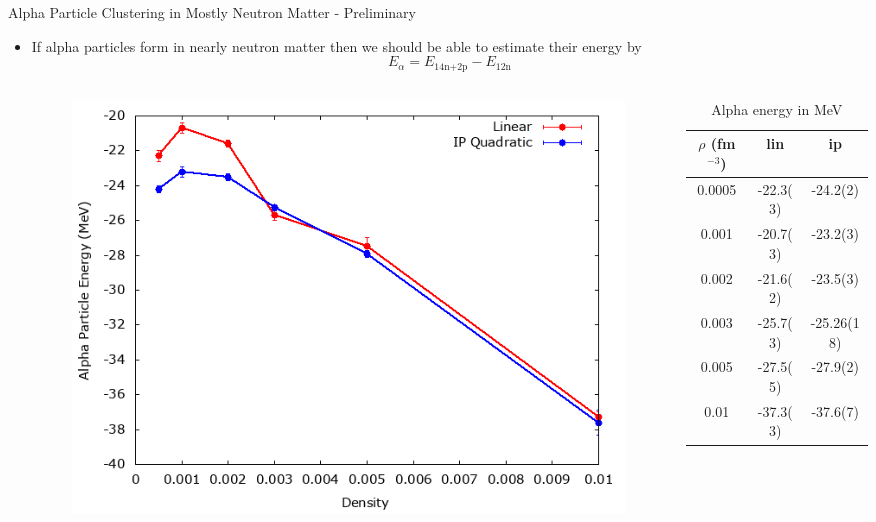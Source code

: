\documentclass{beamer}
\begin{document}
\begin{frame}{\large Alpha Particle Clustering in Mostly Neutron Matter - Preliminary}
\begin{itemize}
   \item If alpha particles form in nearly neutron matter then we should be able to estimate their energy by
   \begin{equation*}
      E_\alpha = E_\text{14n+2p} - E_\text{12n}
   \end{equation*}
   \vspace{-0.25cm}
   \begin{columns}
   \begin{column}{0.6\textwidth}
   \begin{figure}[h]
      \centering
      \includegraphics[width=\textwidth]{alpha.png}
   \end{figure}
   \end{column}
   \hspace{-0.6cm}
   \begin{column}{0.4\textwidth}
   \begin{table}[h!]
      \footnotesize
      \centering
      \caption{Alpha energy in MeV}
      \begin{tabular}{ccc}
         \hline \hline
         $\rho$ (fm$^{-3}$) & lin & ip \\
         \hline
         0.0005& -22.3(3)  & -24.2(2)  \\
         0.001 & -20.7(3)  & -23.2(3)  \\
         0.002 & -21.6(2)  & -23.5(3)  \\
         0.003 & -25.7(3)  & -25.26(18)\\
         0.005 & -27.5(5)  & -27.9(2)  \\
         0.01  & -37.3(3)  & -37.6(7)  \\
         \hline \hline
      \end{tabular}
   \end{table}
   \end{column}
   \hspace{0.6cm}
   \end{columns}
\end{itemize}
\end{frame}
\end{document}
